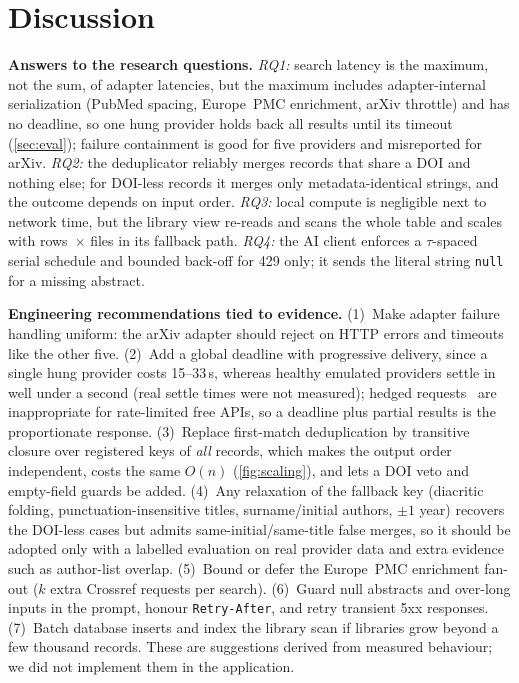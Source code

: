\documentclass[conference]{IEEEtran}
\newcommand{\code}[1]{\texttt{\small #1}}
\begin{document}
\section{Discussion}
\label{sec:disc}

\textbf{Answers to the research questions.} \emph{RQ1:} search latency is the maximum, not the sum, of adapter latencies, but the maximum includes adapter-internal serialization (PubMed spacing, Europe~PMC enrichment, arXiv throttle) and has no deadline, so one hung provider holds back all results until its timeout (\cref{sec:eval}); failure containment is good for five providers and misreported for arXiv. \emph{RQ2:} the deduplicator reliably merges records that share a DOI and nothing else; for DOI-less records it merges only metadata-identical strings, and the outcome depends on input order. \emph{RQ3:} local compute is negligible next to network time, but the library view re-reads and scans the whole table and scales with rows~$\times$ files in its fallback path. \emph{RQ4:} the AI client enforces a $\tau$-spaced serial schedule and bounded back-off for 429 only; it sends the literal string \code{null} for a missing abstract.

\textbf{Engineering recommendations tied to evidence.} (1)~Make adapter failure handling uniform: the arXiv adapter should reject on HTTP errors and timeouts like the other five. (2)~Add a global deadline with progressive delivery, since a single hung provider costs 15--33\,s, whereas healthy emulated providers settle in well under a second (real settle times were not measured); hedged requests~\cite{dean2013tail} are inappropriate for rate-limited free APIs, so a deadline plus partial results is the proportionate response. (3)~Replace first-match deduplication by transitive closure over registered keys of \emph{all} records, which makes the output order independent, costs the same $O(n)$ (\cref{fig:scaling}), and lets a DOI veto and empty-field guards be added. (4)~Any relaxation of the fallback key (diacritic folding, punctuation-insensitive titles, surname/initial authors, $\pm1$ year) recovers the DOI-less cases but admits same-initial/same-title false merges, so it should be adopted only with a labelled evaluation on real provider data and extra evidence such as author-list overlap. (5)~Bound or defer the Europe~PMC enrichment fan-out ($k$ extra Crossref requests per search). (6)~Guard null abstracts and over-long inputs in the prompt, honour \code{Retry-After}, and retry transient 5xx responses. (7)~Batch database inserts and index the library scan if libraries grow beyond a few thousand records. These are suggestions derived from measured behaviour; we did not implement them in the application.
\end{document}
